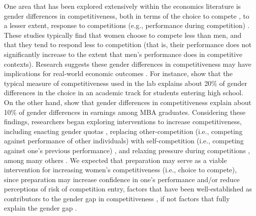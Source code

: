 \documentclass[a4paper, nobind]{templates/ociamthesis}
\begin{document}
One area that has been explored extensively within the economics literature is gender differences in competitiveness, both in terms of the choice to compete \autocites[for review, see][]{Niederle2011,Niederle2017a}, to a lesser extent, response to competitions (e.g., performance during competition) \autocite{Gneezy2003,Gneezy2004,Gunther2010,Samak2013}. These studies typically find that women choose to compete less than men, and that they tend to respond less to competition (that is, their performance does not significantly increase to the extent that men's performance does in competitive contexts). Research suggests these gender differences in competitiveness may have implications for real-world economic outcomes \autocite{Buser2014,Zhang2012,Buser2017c,Buser2017b,Samek2019,Berge2015,Reuben2015,Reuben2017}. For instance, \textcite{Buser2014} show that the typical measure of competitiveness used in the lab explains about 20\% of gender differences in the choice in an academic track for students entering high school. On the other hand, \textcite{Reuben2015} show that gender differences in competitiveness explain about 10\% of gender differences in earnings among MBA graduates. Considering these findings, researchers began exploring interventions to increase competitiveness, including enacting gender quotas \autocite{Niederle2013,Sutter2016}, replacing other-competition (i.e., competing against performance of other individuals) with self-competition (i.e., competing against one's previous performance) \autocite{Bonte2018,Carpenter2018,Klinowski2019,Apicella2017a,Apicella2020}, and relaxing pressure during competitions \autocite{Shurchkov2012}, among many others \autocite[see][ for a review]{Niederle2017a}. We expected that preparation may serve as a viable intervention for increasing women's competitiveness (i.e., choice to compete), since preparation may increase confidence in one's performance and/or reduce perceptions of risk of competition entry, factors that have been well-established as contributors to the gender gap in competitiveness \autocite{Niederle2011}, if not factors that fully explain the gender gap \autocite{Veldhuizen2017,Gillen2019}.
\end{document}
